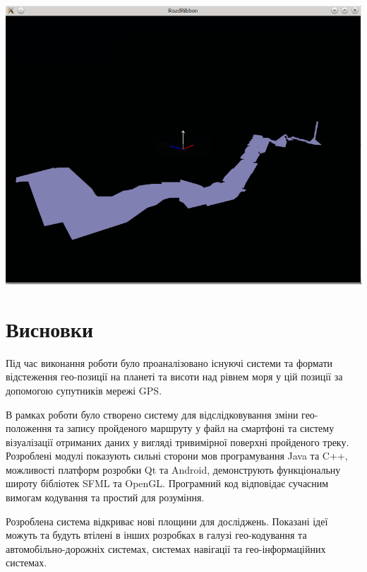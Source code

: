 \documentclass[simple,a4paper,14pt,ukrainian,utf8]{eskdtext}
\begin{document}
	\vspace{2em}
	\includegraphics[scale=0.5]{images/results2.png}

  \newpage
  \section*{Висновки}

    Під час виконання роботи було проаналізовано існуючі системи та формати відстеження гео-позиції на планеті та висоти над рівнем моря у цій позиції за допомогою супутників мережі GPS.

    В рамках роботи було створено систему для відслідковування зміни гео-положення та запису пройденого маршруту у файл на смартфоні та систему візуалізації отриманих даних у вигляді тривимірної поверхні пройденого треку. Розроблені модулі показують сильні сторони мов програмування Java та C++, можливості платформ розробки Qt та Android, демонструють функціональну широту бібліотек SFML та OpenGL. Програмний код відповідає сучасним вимогам кодування та простий для розуміння.

    Розроблена система відкриває нові площини для досліджень. Показані ідеї можуть та будуть втілені в інших розробках в галузі гео-кодування та автомобільно-дорожніх системах, системах навігації та гео-інформаційних системах.
\end{document}
